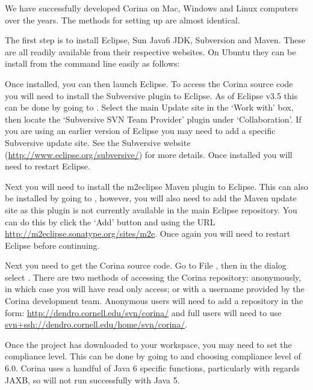 We have successfully developed Corina on Mac, Windows and Linux computers over the years.  The methods for setting up are almost identical.  

The first step is to install Eclipse, Sun Java6 JDK, Subversion and Maven.  These are all readily available from their respective websites.  On Ubuntu they can be install from the command line easily as follows:


Once installed, you can then launch Eclipse.  To access the Corina source code you will need to install the Subversive plugin to Eclipse.  As of Eclipse v3.5 this can be done by going to .  Select the main Update site in the `Work with' box, then locate the `Subversive SVN Team Provider' plugin under `Collaboration'.  If you are using an earlier version of Eclipse you may need to add a specific Subversive update site.  See the Subversive website (\url{http://www.eclipse.org/subversive/}) for more details.  Once installed you will need to restart Eclipse.

Next you will need to install the m2eclipse Maven plugin to Eclipse.  This can also be installed by going to , however, you will also need to add the Maven update site as this plugin is not currently available in the main Eclipse repository.  You can do this by click the `Add' button and using the URL \url{http://m2eclipse.sonatype.org/sites/m2e}.  Once again you will need to restart Eclipse before continuing.

Next you need to get the Corina source code.  Go to File , then in the dialog select .  There are two methods of accessing the Corina repository: anonymously, in which case you will have read only access; or with a username provided by the Corina development team.  Anonymous users will need to add a repository in the form: \url{http://dendro.cornell.edu/svn/corina/} and full users will need to use \url{svn+ssh://dendro.cornell.edu/home/svn/corina/}.

Once the project has downloaded to your workspace, you may need to set the compliance level.  This can be done by going to  and choosing compliance level of 6.0.  Corina uses a handful of Java 6 specific functions, particularly with regards JAXB, so will not run successfully with Java 5.  

